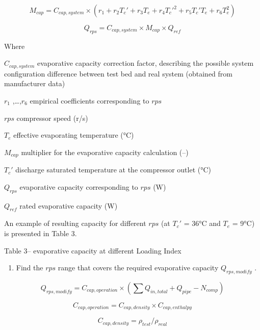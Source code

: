 \begin{equation}
  M_{cap} = C_{cap,system}\times(r_1+r_2{T_c}'+r_3T_e+r_4{T_c}'^2+r_5{T_c}'T_e+r_6T_e^2)
\end{equation}

\begin{equation}
  Q_{rps} = C_{cap,system} \times M_{cap} \times Q_{ref}
\end{equation}

Where

\(C_{cap,system}\) evaporative capacity correction factor, describing the possible system configuration difference between test bed and real system (obtained from manufacturer data)

\(r_1\) ,\ldots{},\(r_6\) empirical coefficients corresponding to \(rps\)

\(rps\) compressor speed (r/s)

\(T_e\) effective evaporating temperature (°C)

\(M_{cap}\) multiplier for the evaporative capacity calculation (--)

\({T_c}'\) discharge saturated temperature at the compressor outlet (°C)

\(Q_{rps}\) evaporative capacity corresponding to \(rps\) (W)

\(Q_{ref}\) rated evaporative capacity (W)

An example of resulting capacity for different \(rps\) (at \({T_c}'\) = 36°C and \(T_e\) = 9°C) is presented in Table 3.

Table 3-- evaporative capacity at different Loading Index

\begin{enumerate}
\def\labelenumi{\alph{enumi}.}
\setcounter{enumi}{1}
\tightlist
\item
  Find the \(rps\) range that covers the required evaporative capacity \(Q_{rps,modify}\) .
\end{enumerate}

\begin{equation}
Q_{rps,modify} = C_{cap,operation}\times(\sum{Q_{in,total}}+Q_{pipe}-N_{comp})
\end{equation}

\begin{equation}
C_{cap,operation} = C_{cap,density}\times{C_{cap,enthalpy}}
\end{equation}

\begin{equation}
C_{cap,density} = \rho_{test}/\rho_{real}
\end{equation}

